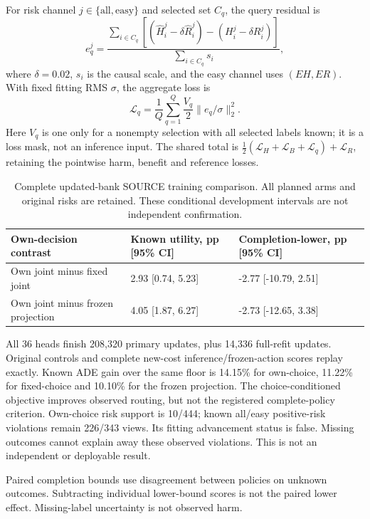 \documentclass[10pt,twocolumn,letterpaper]{article}
\begin{document}
For risk channel $j\in\{\mathrm{all},\mathrm{easy}\}$ and selected set $C_q$, the query residual is
\begin{equation}
e_q^{j}=\frac{\sum_{i\in C_q}[(\widehat H_i^j-\delta\widehat R_i^j)-(H_i^j-\delta R_i^j)]}{\sum_{i\in C_q}s_i},
\end{equation}
where $\delta=0.02$, $s_i$ is the causal scale, and the easy channel uses $(EH,ER)$.
With fixed fitting RMS $\sigma$, the aggregate loss is
\begin{equation}
\mathcal L_q=\frac{1}{Q}\sum_{q=1}^{Q}\frac{V_q}{2}\|e_q/\sigma\|_2^2.
\end{equation}
Here $V_q$ is one only for a nonempty selection with all selected labels known; it is a loss mask, not an inference input.
The shared total is $\frac12(\mathcal L_H+\mathcal L_B+\mathcal L_q)+\mathcal L_R$,
retaining the pointwise harm, benefit and reference losses.


\begin{table}[!t]
\centering\small
\begin{tabularx}{\textwidth}{@{}XXX@{}}\toprule
Own-decision contrast & Known utility, pp [95\% CI] & Completion-lower, pp [95\% CI] \\
\midrule
Own joint minus fixed joint & 2.93 [0.74, 5.23] & -2.77 [-10.79, 2.51] \\
Own joint minus frozen projection & 4.05 [1.87, 6.27] & -2.73 [-12.65, 3.38] \\
\bottomrule
\end{tabularx}
\caption{Complete updated-bank SOURCE training comparison. All planned arms and original risks are retained. These conditional development intervals are not independent confirmation.}
\end{table}
All 36 heads finish 208,320 primary updates, plus 14,336 full-refit updates. Original controls and complete new-cost inference/frozen-action scores replay exactly. Known ADE gain over the same floor is 14.15\% for own-choice, 11.22\% for fixed-choice and 10.10\% for the frozen projection. The choice-conditioned objective improves observed routing, but not the registered complete-policy criterion. Own-choice risk support is 10/444; known all/easy positive-risk violations remain 226/343 views. Its fitting advancement status is false. Missing outcomes cannot explain away these observed violations. This is not an independent or deployable result.

Paired completion bounds use disagreement between policies on unknown outcomes. Subtracting individual lower-bound scores is not the paired lower effect. Missing-label uncertainty is not observed harm.
\end{document}
